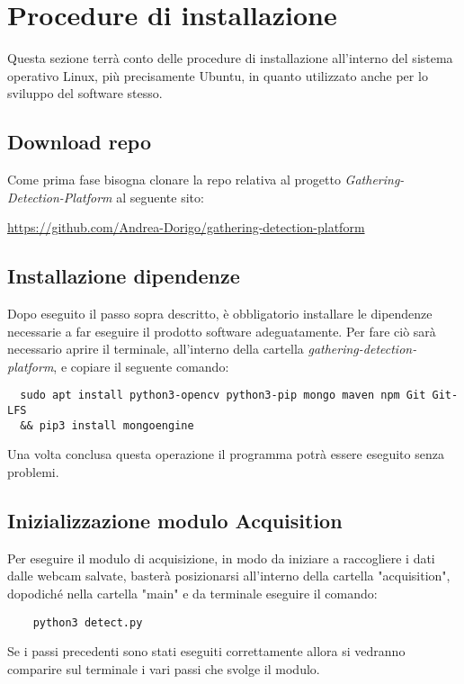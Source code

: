 \chapter{Procedure di installazione}\label{ProceduraDiInstallazione}
Questa sezione terrà conto delle procedure di installazione all'interno del sistema operativo Linux, più precisamente Ubuntu, in quanto utilizzato anche per lo sviluppo del software stesso.

\section{Download repo}\label{ProceduraDiInstallazioneDownloadRepo}
Come prima fase bisogna clonare la repo relativa al progetto \textit{Gathering-Detection-Platform} al seguente sito:
\begin{center}
  \item \url{https://github.com/Andrea-Dorigo/gathering-detection-platform}
\end{center}

\section{Installazione dipendenze}\label{ProceduraDiInstallazioneInstallazioneDipendenze}
Dopo eseguito il passo sopra descritto, è obbligatorio installare le dipendenze necessarie a far eseguire il prodotto software adeguatamente.
Per fare ciò sarà necessario aprire il terminale, all'interno della cartella \textit{gathering-detection-platform}, e copiare il seguente comando:
\begin{lstlisting}
  sudo apt install python3-opencv python3-pip mongo maven npm Git Git-LFS
  && pip3 install mongoengine
\end{lstlisting}

Una volta conclusa questa operazione il programma potrà essere eseguito senza problemi.

\section{Inizializzazione modulo Acquisition}\label{ProceduraDiInstallazioneInizializzazioneModuloAcquisition}
Per eseguire il modulo di acquisizione, in modo da iniziare a raccogliere i dati dalle webcam salvate, basterà posizionarsi all'interno della cartella "acquisition", dopodiché nella cartella "main" e da terminale eseguire il comando:
\begin{lstlisting}
    python3 detect.py
\end{lstlisting}
Se i passi precedenti sono stati eseguiti correttamente allora si vedranno comparire sul terminale i vari passi che svolge il modulo.

